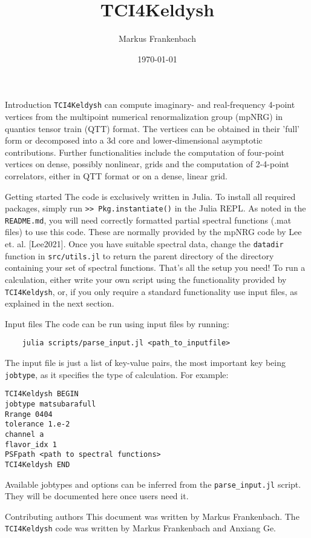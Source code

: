 \documentclass[12pt]{article}
\title{TCI4Keldysh}
\author{Markus Frankenbach}
\date{\today}
\begin{document}
\maketitle

\begin{section}{Introduction}
\texttt{TCI4Keldysh} can compute imaginary- and real-frequency 4-point vertices from the multipoint numerical renormalization group (mpNRG) in quantics tensor train (QTT) format.
The vertices can be obtained in their 'full' form or decomposed into a 3d core and lower-dimensional asymptotic contributions.
Further functionalities include the computation of four-point vertices on dense, possibly nonlinear, grids and the computation of 2-4-point correlators, either
in QTT format or on a dense, linear grid.
\end{section}

\begin{section}{Getting started}
The code is exclusively written in Julia. To install all required packages,
simply run \texttt{>> Pkg.instantiate()} in the Julia REPL.
As noted in the \texttt{README.md}, you will need correctly formatted partial spectral functions (.mat files) to use this code.
These are normally provided by the mpNRG code by Lee et. al. [Lee2021].
Once you have suitable spectral data, change the \texttt{datadir} function in \texttt{src/utils.jl} to
return the parent directory of the directory containing your set of spectral functions.
That's all the setup you need! To run a calculation, either write your own script using
the functionality provided by \texttt{TCI4Keldysh}, or, if you only require a standard functionality
use input files, as explained in the next section.
\end{section}

\begin{section}{Input files}
The code can be run using input files by running:
\begin{verbatim}
    julia scripts/parse_input.jl <path_to_inputfile>
\end{verbatim}
The input file is just a list of key-value pairs, the most important key being
\texttt{jobtype}, as it specifies the type of calculation. For example:
\begin{verbatim}
TCI4Keldysh BEGIN
jobtype matsubarafull
Rrange 0404
tolerance 1.e-2
channel a
flavor_idx 1
PSFpath <path to spectral functions>
TCI4Keldysh END
\end{verbatim}
Available jobtypes and options can be inferred from the \texttt{parse\_input.jl} script.
They will be documented here once users need it.
\end{section}

\begin{section}{Contributing authors}
This document was written by Markus Frankenbach. The \texttt{TCI4Keldysh} code was
written by Markus Frankenbach and Anxiang Ge.
\end{section}

\nocite{*}


\end{document}
